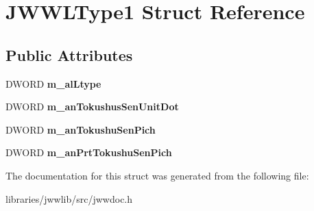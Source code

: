 \hypertarget{structJWWLType1}{\section{J\-W\-W\-L\-Type1 Struct Reference}
\label{structJWWLType1}
}
\subsection*{Public Attributes}
\begin{DoxyCompactItemize}
\item 
\hypertarget{structJWWLType1_a251520f417b3a69ff8d078b2f1a3d55b}{D\-W\-O\-R\-D {\bfseries m\-\_\-al\-Ltype}}\label{structJWWLType1_a251520f417b3a69ff8d078b2f1a3d55b}

\item 
\hypertarget{structJWWLType1_a162aa3b01d32f57c291d1071465c4905}{D\-W\-O\-R\-D {\bfseries m\-\_\-an\-Tokushus\-Sen\-Unit\-Dot}}\label{structJWWLType1_a162aa3b01d32f57c291d1071465c4905}

\item 
\hypertarget{structJWWLType1_ae8168fdce355f89a346b5acede99ee8c}{D\-W\-O\-R\-D {\bfseries m\-\_\-an\-Tokushu\-Sen\-Pich}}\label{structJWWLType1_ae8168fdce355f89a346b5acede99ee8c}

\item 
\hypertarget{structJWWLType1_adb5367e531a786df4638133d3aac9595}{D\-W\-O\-R\-D {\bfseries m\-\_\-an\-Prt\-Tokushu\-Sen\-Pich}}\label{structJWWLType1_adb5367e531a786df4638133d3aac9595}

\end{DoxyCompactItemize}


The documentation for this struct was generated from the following file\-:\begin{DoxyCompactItemize}
\item 
libraries/jwwlib/src/jwwdoc.\-h\end{DoxyCompactItemize}
